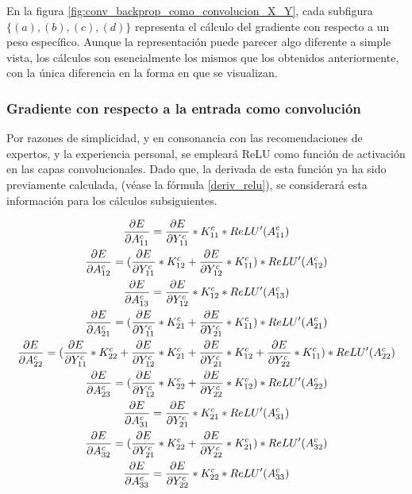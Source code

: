 En la figura \ref{fig:conv_backprop_como_convolucion_X_Y}, cada subfigura $\{(a), (b), (c), (d)\}$ representa el cálculo del gradiente con respecto a un peso específico. Aunque la representación puede parecer algo diferente a simple vista, los cálculos son esencialmente los mismos que los obtenidos anteriormente, con la única diferencia en la forma en que se visualizan.

\subsubsection{Gradiente con respecto a la entrada como convolución}

Por razones de simplicidad, y en consonancia con las recomendaciones de expertos, y la experiencia personal, se empleará ReLU como función de activación en las capas convolucionales. Dado que, la derivada de esta función ya ha sido previamente calculada, (véase la fórmula \ref{deriv_relu}), se considerará esta información para los cálculos subsiguientes.


\begin{gather}
	\frac{\partial E}{\partial A^c_{11}} = \frac{\partial E}{\partial Y^c_{11}} * K^c_{11} *  ReLU'(A^c_{11}) \notag \\
	\frac{\partial E}{\partial A^c_{12}} = (\frac{\partial E}{\partial Y^c_{11}} * K^c_{12} + \frac{\partial E}{\partial Y^c_{12}} * K^c_{11}) * ReLU'(A^c_{12}) \notag \\
	\frac{\partial E}{\partial A^c_{13}} = \frac{\partial E}{\partial Y^c_{12}} * K^c_{12} * ReLU'(A^c_{13}) \notag \\
	\frac{\partial E}{\partial A^c_{21}} = (\frac{\partial E}{\partial Y^c_{11}} * K^c_{21} + \frac{\partial E}{\partial Y^c_{21}} * K^c_{11}) * ReLU'(A^c_{21}) \notag \\
	\frac{\partial E}{\partial A^c_{22}} = (\frac{\partial E}{\partial Y^c_{11}} * K^c_{22} + \frac{\partial E}{\partial Y^c_{12}} * K^c_{21} + \frac{\partial E}{\partial Y^c_{21}} * K^c_{12} + \frac{\partial E}{\partial Y^c_{22}} * K^c_{11}) * ReLU'(A^c_{22}) \notag \\
	\frac{\partial E}{\partial A^c_{23}} = (\frac{\partial E}{\partial Y^c_{12}} * K^c_{22} + \frac{\partial E}{\partial Y^c_{22}} * K^c_{12}) * ReLU'(A^c_{22})\notag \\
	\frac{\partial E}{\partial A^c_{31}} = \frac{\partial E}{\partial Y^c_{21}} * K^c_{21} * ReLU'(A^c_{31})\notag \\
	\frac{\partial E}{\partial A^c_{32}} = (\frac{\partial E}{\partial Y^c_{21}} * K^c_{22} + \frac{\partial E}{\partial Y^c_{22}} * K^c_{21}) * ReLU'(A^c_{32}) \notag \\
	\frac{\partial E}{\partial A^c_{33}} = \frac{\partial E}{\partial Y^c_{22}} * K^c_{22} * ReLU'(A^c_{33}) \notag
\end{gather}

